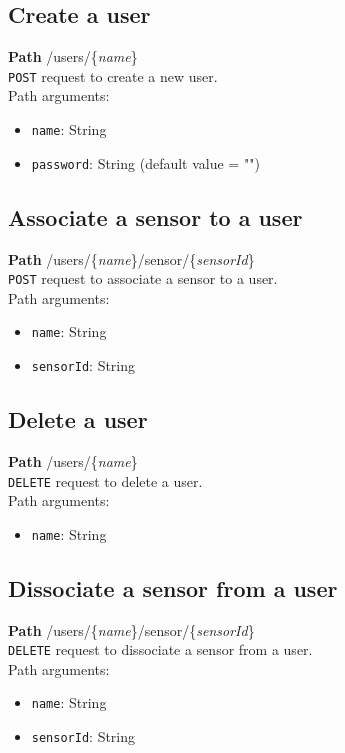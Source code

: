\documentclass[a4paper, oneside, 11pt]{book}
\begin{document}
\subsection*{Create a user}
\textbf{Path} /users/\{\textit{name}\} \\
\texttt{POST} request  to create a new user.\\
Path arguments:
\begin{itemize}
	\item \texttt{name}: String
	\item \texttt{password}: String (default value = "")
\end{itemize}

\subsection*{Associate a sensor to a user}
\textbf{Path} /users/\{\textit{name}\}/sensor/\{\textit{sensorId}\} \\
\texttt{POST} request to associate a sensor to a user.\\
Path arguments:
\begin{itemize}
	\item \texttt{name}: String
	\item \texttt{sensorId}: String
\end{itemize}

\subsection*{Delete a user}
\textbf{Path} /users/\{\textit{name}\} \\
\texttt{DELETE} request to delete a user.\\
Path arguments:
\begin{itemize}
	\item \texttt{name}: String
\end{itemize}

\subsection*{Dissociate a sensor from a user}
\textbf{Path} /users/\{\textit{name}\}/sensor/\{\textit{sensorId}\} \\
\texttt{DELETE} request to dissociate a sensor from a user.\\
Path arguments:
\begin{itemize}
	\item \texttt{name}: String
	\item \texttt{sensorId}: String
\end{itemize}
\end{document}
